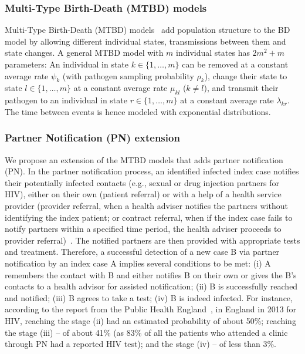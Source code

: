 \documentclass[10pt,letterpaper]{article}
\begin{document}
\subsubsection*{Multi-Type Birth-Death (MTBD) models}
Multi-Type Birth-Death (MTBD) models~\cite{Stadler2013a} add population structure to the BD model by allowing different individual states, transmissions between them and state changes. A general MTBD model with $m$ individual states has $2m^2 + m$ parameters: An individual in state $k \in \{1, \ldots, m\}$ can be removed at a constant average rate $\psi_k$ (with pathogen sampling probability $\rho_k$), change their state to state $l \in \{1, \ldots, m\}$ at a constant average rate $\mu_{kl}$ ($k \neq l$), and transmit their pathogen to an individual in state $r \in \{1, \ldots, m\} $ at a constant average rate $\lambda_{kr}$. The time between events %
is hence modeled with exponential distributions.


\subsubsection*{Partner Notification (PN) extension}

We propose an %
extension of the MTBD models that adds partner notification (PN).  
In the partner notification process, an identified infected index case notifies their potentially infected contacts (e.g., sexual or drug injection partners for HIV), either on their own (patient referral) or with a help of a health service provider (provider referral, when a health adviser notifies the partners without identifying the index patient; or contract referral, when if the index case fails to notify partners within a specified time period, the health adviser proceeds to provider referral)~\cite{wardPartnerNotification2014}. The notified partners are then provided with appropriate tests and treatment. Therefore, a successful detection of a new case B via partner notification by an index case A implies several conditions to be met: (i) A remembers the contact with B and  either notifies B on their own or gives the B's contacts to a health advisor for assisted notification; (ii) B is successfully reached and notified; (iii) B agrees to take a test; (iv) B is indeed infected. 
For instance, according to the report from the Public Health England~\cite{aHIVUnitedKingdom2014}, in England in 2013 for HIV, reaching the stage (ii) had an estimated probability of about 50\%; reaching the stage (iii) -- of about 41\% (as 83\% of all the patients who attended a clinic through PN had a reported HIV test); and the stage (iv) -- of less than 3\%.
\end{document}
